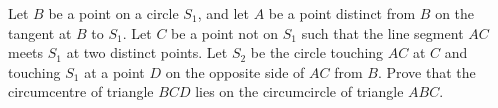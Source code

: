 Let $B$ be a point on a circle $S_1$, and let $A$ be a point distinct from $B$ on the tangent at $B$ to $S_1$. Let $C$ be a point not on $S_1$ such that the line segment $AC$ meets $S_1$ at two distinct points. Let $S_2$ be the circle touching $AC$ at $C$ and touching $S_1$ at a point $D$ on the opposite side of $AC$ from $B$. Prove that the circumcentre of triangle $BCD$ lies on the circumcircle of triangle $ABC$.